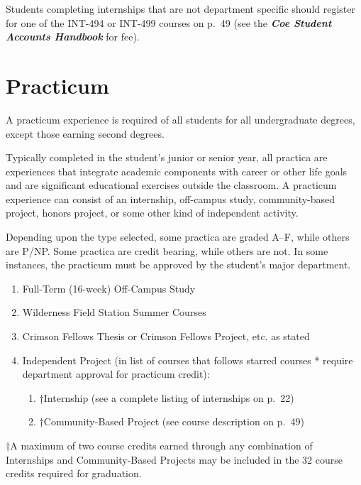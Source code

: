 \documentclass[
  letterpaper,
]{scrbook}
\providecommand{\tightlist}{%
  \setlength{\itemsep}{0pt}\setlength{\parskip}{0pt}}
\begin{document}
Students completing internships that are not department specific should
register for one of the INT-494 or INT-499 courses on p.~49 (see the
\textbf{\emph{Coe Student Accounts Handbook}} for fee).

\section{Practicum}\label{sec-practicum}

A practicum experience is required of all students for all undergraduate
degrees, except those earning second degrees.

Typically completed in the student's junior or senior year, all practica
are experiences that integrate academic components with career or other
life goals and are significant educational exercises outside the
classroom. A practicum experience can consist of an internship,
off-campus study, community-based project, honors project, or some other
kind of independent activity.

Depending upon the type selected, some practica are graded A--F, while
others are P/NP. Some practica are credit bearing, while others are not.
In some instances, the practicum must be approved by the student's major
department.

\begin{enumerate}
\def\labelenumi{\arabic{enumi}.}
\tightlist
\item
  Full-Term (16-week) Off-Campus Study
\item
  Wilderness Field Station Summer Courses
\item
  Crimson Fellows Thesis or Crimson Fellows Project, etc. as stated
\item
  Independent Project (in list of courses that follows starred courses *
  require department approval for practicum credit):

  \begin{enumerate}
  \def\labelenumii{\arabic{enumii}.}
  \setcounter{enumii}{4}
  \tightlist
  \item
    †Internship (see a complete listing of internships on p.~22)
  \item
    †Community-Based Project (see course description on p.~49)
  \end{enumerate}
\end{enumerate}

†A maximum of two course credits earned through any combination of
Internships and Community-Based Projects may be included in the 32
course credits required for graduation.
\end{document}
